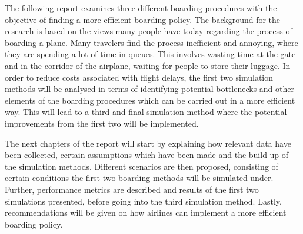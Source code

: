 The following report examines three different boarding procedures with the objective of finding a more efficient boarding policy. The background for the research is based on the views many people have today regarding the process of boarding a plane. Many travelers find the process inefficient and annoying, where they are spending a lot of time in queues. This involves wasting time at the gate and in the corridor of the airplane, waiting for people to store their luggage. In order to reduce costs associated with flight delays, the first two simulation methods will be analysed in terms of identifying potential bottlenecks and other elements of the boarding procedures which can be carried out in a more efficient way. This will lead to a third and final simulation method where the potential improvements from the first two will be implemented.   

\indent \newline 
The next chapters of the report will start by explaining how relevant data have been collected, certain assumptions which have been made and the build-up of the simulation methods. Different scenarios are then proposed, consisting of certain conditions the first two boarding methods will be simulated under. Further, performance metrics are described and results of the first two simulations presented, before going into the third simulation method. Lastly, recommendations will be given on how airlines can implement a more efficient boarding policy.   

